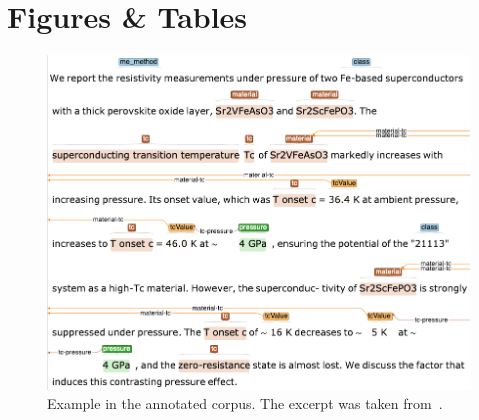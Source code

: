 \documentclass[]{interact}
\theoremstyle{plain}%
\theoremstyle{definition}
\theoremstyle{remark}
\begin{document}



  

\section*{Figures \& Tables}

\begin{figure}[ht]
  \centering
  \includegraphics[width=\linewidth]{example-annotated-corpus-postprocess.png}
  \caption{Example in the annotated corpus. The excerpt was taken from~\cite{Kotegawa2009ContrastingPE}.}
  \label{fig:example-annotations-and-links}
\end{figure}
\end{document}
